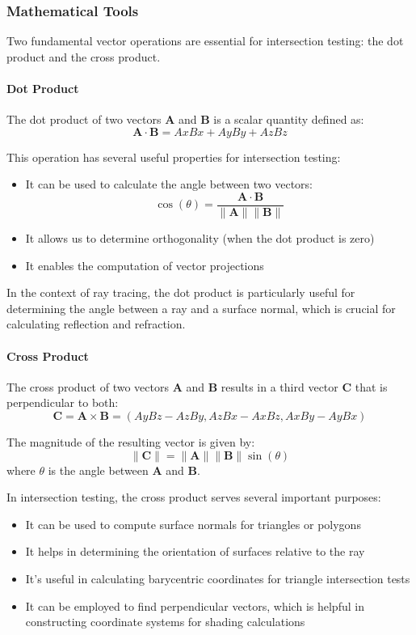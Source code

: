 \documentclass[12pt]{article}
\begin{document}
\subsubsection{Mathematical Tools}

Two fundamental vector operations are essential for intersection testing: the dot product and the cross product.

\paragraph{Dot Product}
The dot product of two vectors \(\mathbf{A}\) and \(\mathbf{B}\) is a scalar quantity defined as:
\[
    \mathbf{A} \cdot \mathbf{B} = Ax Bx + Ay By + Az Bz
\]

This operation has several useful properties for intersection testing:

\begin{itemize}
    \item It can be used to calculate the angle between two vectors:
          \[
              \cos(\theta) = \frac{\mathbf{A} \cdot \mathbf{B}}{\|\mathbf{A}\| \|\mathbf{B}\|}
          \]
    \item It allows us to determine orthogonality (when the dot product is zero)
    \item It enables the computation of vector projections
\end{itemize}

In the context of ray tracing, the dot product is particularly useful for determining the angle between a ray and a surface normal, which is crucial for calculating reflection and refraction.

\paragraph{Cross Product}
The cross product of two vectors \(\mathbf{A}\) and \(\mathbf{B}\) results in a third vector \(\mathbf{C}\) that is perpendicular to both:
\[
    \mathbf{C} = \mathbf{A} \times \mathbf{B} = \left( Ay Bz - Az By, Az Bx - Ax Bz, Ax By - Ay Bx \right)
\]

The magnitude of the resulting vector is given by:
\[
    \|\mathbf{C}\| = \|\mathbf{A}\| \|\mathbf{B}\| \sin(\theta)
\]
where \(\theta\) is the angle between \(\mathbf{A}\) and \(\mathbf{B}\).

In intersection testing, the cross product serves several important purposes:

\begin{itemize}
    \item It can be used to compute surface normals for triangles or polygons
    \item It helps in determining the orientation of surfaces relative to the ray
    \item It's useful in calculating barycentric coordinates for triangle intersection tests
    \item It can be employed to find perpendicular vectors, which is helpful in constructing coordinate systems for shading calculations
\end{itemize}
\end{document}
